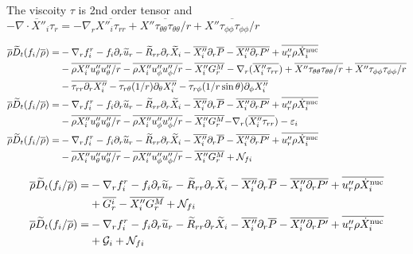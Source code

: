 \documentclass[10pt,paper=a4]{report}
\newcommand{\eht}{\overline}
\newcommand{\fht}{\widetilde}
\newcommand{\fav}{\widetilde}
\def\erho{\eht{\rho}}
\begin{document}
\noindent
The viscoity $\tau$ is 2nd order tensor and $-\eht{\nabla \cdot X''_i \tau_r}= -\nabla_r \overline{X''_i \tau_{rr}} + \overline{X''\tau_{\theta \theta} \tau_{\theta \theta}/r} + \overline{X''\tau_{\phi \phi} \tau_{\phi \phi}/r}$ 

\begin{align}
\erho \fav{D}_t (f_i / \eht{\rho}) = &  -\nabla_r f_i^r  - f_i \partial_r \fht{u}_r - \fht{R}_{rr} \partial_r \fht{X}_i -\eht{X''_i} \partial_r \eht{P} - \eht{X''_i \partial_r P'} + \overline{u''_r \rho \dot{X}_i^{\rm nuc}} \\
& -\eht{\rho X''_i u''_\theta u''_\theta/r} - \eht{\rho X''_i u''_\phi u''_\phi/r}  - \eht{X''_i G_r^M} -\nabla_r (\eht{X_i''\tau_{rr}}) + \overline{X''\tau_{\theta \theta} \tau_{\theta \theta}/r} + \overline{X''\tau_{\phi \phi} \tau_{\phi \phi}/r}\\
&- \eht{\tau_{rr}\partial_r X''_i} - \eht{\tau_{r\theta}(1/r)\partial_\theta X''_i} - \eht{\tau_{r\phi}(1/r\sin{\theta})\partial_\phi X''_i} \\
\erho \fav{D}_t (f_i / \eht{\rho}) = &  -\nabla_r f_i^r  - f_i \partial_r \fht{u}_r - \fht{R}_{rr} \partial_r \fht{X}_i -\eht{X''_i} \partial_r \eht{P} - \eht{X''_i \partial_r P'} + \overline{u''_r \rho \dot{X}_i^{\rm nuc}} \\
& -\eht{\rho X''_i u''_\theta u''_\theta/r} - \eht{\rho X''_i u''_\phi u''_\phi/r}  - \eht{X''_i G_r^M} {-\nabla_r (\eht{X''_i \tau_{rr}}) - \varepsilon_i}\\
\erho \fav{D}_t (f_i / \eht{\rho}) = &  -\nabla_r f_i^r  - f_i \partial_r \fht{u}_r - \fht{R}_{rr} \partial_r \fht{X}_i -\eht{X''_i} \partial_r \eht{P} - \eht{X''_i \partial_r P'} + \overline{u''_r \rho \dot{X}_i^{\rm nuc}} \\
& -\eht{\rho X''_i u''_\theta u''_\theta/r} - \eht{\rho X''_i u''_\phi u''_\phi/r}  - \eht{X''_i G_r^M} + {\mathcal N_{fi}}
\end{align}

\begin{align}
\erho \fav{D}_t (f_i / \eht{\rho}) = &  -\nabla_r f_i^r  - f_i \partial_r \fht{u}_r - \fht{R}_{rr} \partial_r \fht{X}_i -\eht{X''_i} \partial_r \eht{P} - \eht{X''_i \partial_r P'} + \overline{u''_r \rho \dot{X}_i^{\rm nuc}} \\
& + {\eht{G_{r}^i} - \eht{X''_i G_r^M}} + {\mathcal N_{fi}}\\
\erho \fav{D}_t (f_i / \eht{\rho}) = &  -\nabla_r f_i^r  - f_i \partial_r \fht{u}_r - \fht{R}_{rr} \partial_r \fht{X}_i -\eht{X''_i} \partial_r \eht{P} - \eht{X''_i \partial_r P'} + \overline{u''_r \rho \dot{X}_i^{\rm nuc}} \\
& + {\mathcal G_i} + {\mathcal N_{fi}} \label{eq:rans_falpha} 
\end{align}
\end{document}
